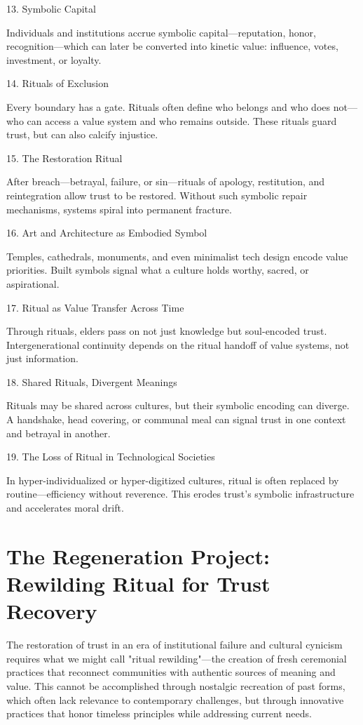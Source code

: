 \documentclass[11pt,oneside]{book}
\begin{document}
13. Symbolic Capital


Individuals and institutions accrue symbolic capital—reputation, honor, recognition—which can later be converted into kinetic value: influence, votes, investment, or loyalty.

14. Rituals of Exclusion


Every boundary has a gate. Rituals often define who belongs and who does not—who can access a value system and who remains outside. These rituals guard trust, but can also calcify injustice.

15. The Restoration Ritual


After breach—betrayal, failure, or sin—rituals of apology, restitution, and reintegration allow trust to be restored. Without such symbolic repair mechanisms, systems spiral into permanent fracture.

16. Art and Architecture as Embodied Symbol


Temples, cathedrals, monuments, and even minimalist tech design encode value priorities. Built symbols signal what a culture holds worthy, sacred, or aspirational.

17. Ritual as Value Transfer Across Time


Through rituals, elders pass on not just knowledge but soul-encoded trust. Intergenerational continuity depends on the ritual handoff of value systems, not just information.

18. Shared Rituals, Divergent Meanings


Rituals may be shared across cultures, but their symbolic encoding can diverge. A handshake, head covering, or communal meal can signal trust in one context and betrayal in another.

19. The Loss of Ritual in Technological Societies


In hyper-individualized or hyper-digitized cultures, ritual is often replaced by routine—efficiency without reverence. This erodes trust’s symbolic infrastructure and accelerates moral drift.
\section{The Regeneration Project: Rewilding Ritual for Trust Recovery}

The restoration of trust in an era of institutional failure and cultural cynicism requires what we might call "ritual rewilding"—the creation of fresh ceremonial practices that reconnect communities with authentic sources of meaning and value. This cannot be accomplished through nostalgic recreation of past forms, which often lack relevance to contemporary challenges, but through innovative practices that honor timeless principles while addressing current needs.
\end{document}
